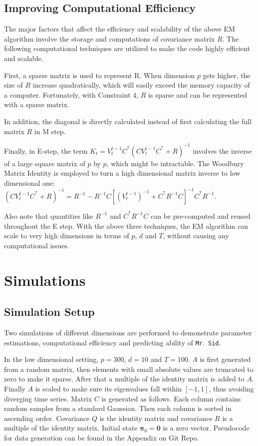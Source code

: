 \documentclass[fleqn,12pt]{article}
\newcommand{\T}{^{\ensuremath{\mathsf{T}}}}           %
\newcommand{\mrsid}{{\sc \texttt{Mr}.~\texttt{Sid}}}
\begin{document}
\subsection{Improving Computational Efficiency}
The major factors that affect the efficiency and scalability of the above EM algorithm involve the storage and computations of covariance matrix $R$. The following computational techniques are utilized to make the code highly efficient and scalable.

First, a sparse matrix is used to represent R. When dimension $p$ gets higher, the size of $R$ increase quadratically, which will easily exceed the memory capacity of a computer.  Fortunately, with Constraint 4, $R$ is sparse and can be represented with a sparse matrix.

In addition, the diagonal is directly calculated instead of first calculating the full matrix $R$ in M step.

Finally, in E-step, the term $K_t=V_t^{t-1}C^{\T}(CV_t^{t-1}C^{\T}+R)^{-1}$ involves the inverse of a large square matrix of $p$ by $p$, which might be intractable. The Woodbury Matrix Identity is employed to turn a high dimensional matrix inverse to low dimensional one: $(CV_t^{t-1}C^{\T}+R)^{-1} = R^{-1} - R^{-1}C[(V_t^{t-1})^{-1} + C^{\T}R^{-1}C]^{-1}C^{\T}R^{-1}$.

Also note that quantities like $R^{-1}$ and $C^{\T}R^{-1}C$ can be pre-computed and reused throughout the E step. With the above three techniques, the EM algorithm can scale to very high dimensions in terms of $p$, $d$ and $T$, without causing any computational issues.


\section{Simulations}
\subsection{Simulation Setup}
\label{sec:simsetup}
Two simulations of different dimensions are performed to demonstrate parameter estimations, computational efficiency and predicting ability of \mrsid.

In the low dimensional setting, $p = 300$, $d = 10$ and $T = 100$. $A$ is first generated from a random matrix, then elements with small absolute values are truncated to zero to make it sparse. After that a multiple of the identity matrix is added to $A$. Finally $A$ is scaled to make sure its eigenvalues fall within $[-1,1]$, thus avoiding diverging time series. Matrix $C$ is generated as follows. Each column contains random samples from a standard Gaussian. Then each column is sorted in ascending order. Covariance $Q$ is the identity matrix and covariance $R$ is a multiple of the identity matrix. Initial state $\mathbf{\pi}_0 = \mathbf{0}$ is a zero vector. Pseudocode for data generation can be found in the Appendix on Git Repo.
\end{document}
